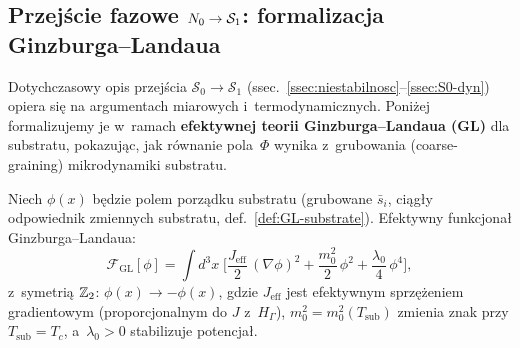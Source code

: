 \subsection{Przej\'scie fazowe $N_0 \to \mathcal{S}_1$:
  formalizacja Ginzburga--Landaua}\label{ssec:GL-transition}

Dotychczasowy opis przej\'scia $\mathcal{S}_0 \to \mathcal{S}_1$
(ssec.~\ref{ssec:niestabilnosc}--\ref{ssec:S0-dyn})
opiera si\k{e} na argumentach miarowych i~termodynamicznych.
Poni\.zej formalizujemy je w~ramach \textbf{efektywnej teorii
Ginzburga--Landaua (GL)} dla substratu, pokazuj\k{a}c, jak
r\'ownanie pola~$\Phi$ wynika z~grubowania (coarse-graining)
mikrodynamiki substratu.

\begin{definition}\label{def:GL-substrate}
Niech $\phi(x)$ b\k{e}dzie polem porz\k{a}dku substratu
(grubowane $\bar{s}_i$, ci\k{a}g\l{}y odpowiednik zmiennych
substratu, def.~\ref{def:GL-substrate}).
Efektywny funkcjona\l{} Ginzburga--Landaua:
\begin{equation}\label{eq:GL-functional}
  \boxed{
    \mathcal{F}_{\mathrm{GL}}[\phi]
    = \int d^3x\;\biggl[
      \frac{J_{\mathrm{eff}}}{2}\,(\nabla\phi)^2
      + \frac{m_0^2}{2}\,\phi^2
      + \frac{\lambda_0}{4}\,\phi^4
    \biggr],
  }
\end{equation}
z~symetri\k{a} $\mathbb{Z}_2$: $\phi(x) \to -\phi(x)$,
gdzie $J_{\mathrm{eff}}$ jest efektywnym sprz\k{e}\.zeniem
gradientowym (proporcjonalnym do $J$ z~$H_\Gamma$),
$m_0^2 = m_0^2(T_{\mathrm{sub}})$ zmienia znak
przy $T_{\mathrm{sub}} = T_c$, a~$\lambda_0 > 0$
stabilizuje potencja\l{}.
\end{definition}

